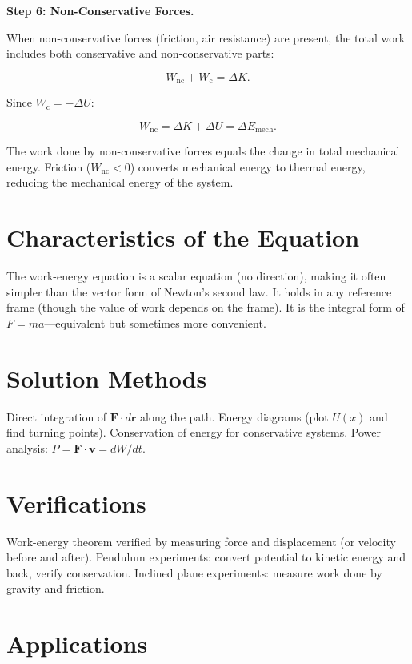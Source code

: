 \textbf{Step 6: Non-Conservative Forces.}

When non-conservative forces (friction, air resistance) are present, the total work includes both conservative and non-conservative parts:

\begin{equation}
W_{\text{nc}} + W_{\text{c}} = \Delta K.
\end{equation}

Since $W_{\text{c}} = -\Delta U$:

\begin{equation}
W_{\text{nc}} = \Delta K + \Delta U = \Delta E_{\text{mech}}.
\end{equation}

The work done by non-conservative forces equals the change in total mechanical energy. Friction ($W_{\text{nc}} < 0$) converts mechanical energy to thermal energy, reducing the mechanical energy of the system.

\section*{Characteristics of the Equation}

The work-energy equation is a scalar equation (no direction), making it often simpler than the vector form of Newton's second law. It holds in any reference frame (though the value of work depends on the frame). It is the integral form of $F = ma$---equivalent but sometimes more convenient.
\section*{Solution Methods}

Direct integration of $\mathbf{F} \cdot d\mathbf{r}$ along the path. Energy diagrams (plot $U(x)$ and find turning points). Conservation of energy for conservative systems. Power analysis: $P = \mathbf{F} \cdot \mathbf{v} = dW/dt$.
\section*{Verifications}

Work-energy theorem verified by measuring force and displacement (or velocity before and after). Pendulum experiments: convert potential to kinetic energy and back, verify conservation. Inclined plane experiments: measure work done by gravity and friction.
\section*{Applications}

